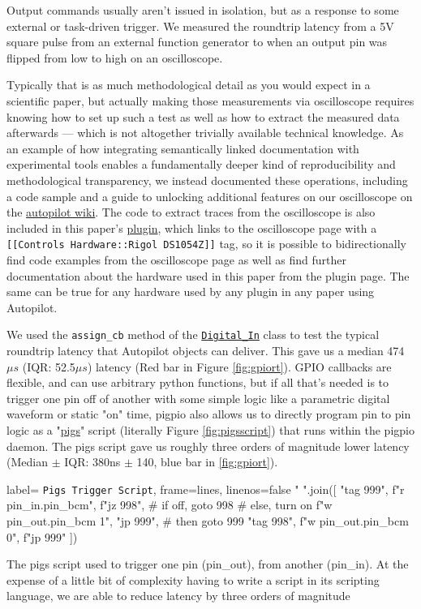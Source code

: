 Output commands usually aren't issued in isolation, but as a response to some external or task-driven trigger. We measured the roundtrip latency from a 5V square pulse from an external function generator to when an output pin was flipped from low to high on an oscilloscope. 

Typically that is as much methodological detail as you would expect in a scientific paper, but actually making those measurements via oscilloscope requires knowing how to set up such a test as well as how to extract the measured data afterwards --- which is not altogether trivially available technical knowledge. As an example of how integrating semantically linked documentation with experimental tools enables a fundamentally deeper kind of reproducibility and methodological transparency, we instead documented these operations, including a code sample and a guide to unlocking additional features on our oscilloscope on the \href{https://wiki.auto-pi-lot.com/index.php/Rigol\_DS1054Z}{autopilot wiki}. The code to extract traces from the oscilloscope is also included in this paper's \href{https://wiki.auto-pi-lot.com/index.php/Plugin:Autopilot\_Paper}{plugin}, which links to the oscilloscope page with a \texttt{[[Controls Hardware::Rigol DS1054Z]]} tag, so it is possible to bidirectionally find code examples from the oscilloscope page as well as find further documentation about the hardware used in this paper from the plugin page. The same can be true for any hardware used by any plugin in any paper using Autopilot.

We used the \texttt{assign\_cb} method of the \href{https://docs.auto-pi-lot.com/en/latest/hardware/gpio.html\#autopilot.hardware.gpio.Digital_In.assign_cb}{\texttt{Digital\_In}} class to test the typical roundtrip latency that Autopilot objects can deliver. This gave us a median 474 $\mu s$ (IQR: 52.5$\mu s$) latency (Red bar in Figure \ref{fig:gpiort}). GPIO callbacks are flexible, and can use arbitrary python functions, but if all that's needed is to trigger one pin off of another with some simple logic like a parametric digital waveform or static "on" time, pigpio also allows us to directly program pin to pin logic as a "\href{http://abyz.me.uk/rpi/pigpio/pigs.html}{pigs}" script (literally Figure \ref{fig:pigsscript}) that runs within the pigpio daemon. The pigs script gave us roughly three orders of magnitude lower latency (Median $\pm$ IQR: 380ns $\pm$ 140, blue bar in \ref{fig:gpiort}). 

\begin{marginfigure}[-7cm]
\begin{pythoncode*}{
label= \texttt{Pigs Trigger Script},
frame=lines,
linenos=false}
" ".join([
  "tag 999",
  f"r {pin_in.pin_bcm}",
  f"jz 998", # if off, goto 998
  # else, turn on
  f"w {pin_out.pin_bcm} 1",
  "jp 999", # then goto 999
  "tag 998",
  f"w {pin_out.pin_bcm} 0",
  f"jp 999"
])
\end{pythoncode*}
\caption{The pigs script used to trigger one pin (pin\_out), from another (pin\_in). At the expense of a little bit of complexity having to write a script in its scripting language, we are able to reduce latency by three orders of magnitude}
\label{fig:pigsscript}
\end{marginfigure}


